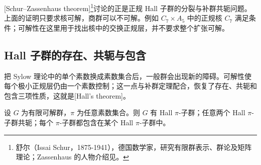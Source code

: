 [Schur--Zassenhaus theorem]\footnote{舒尔（Issai Schur，1875-1941），德国数学家，研究有限群表示、群论及矩阵理论；Zassenhaus 的人物介绍见。}讨论的正是正规 Hall 子群的分裂与补群共轭问题。上面的证明只要求核可解，商群可以不可解。例如 \(C_7\times A_5\) 中的正规核 \(C_7\) 满足条件；可解性在这里用于找出核中的交换正规层，并不要求整个扩张可解。

\subsection{Hall 子群的存在、共轭与包含}
\label{b1:subsec:C06:03}

把 Sylow 理论中的单个素数换成素数集合后，一般群会出现新的障碍。可解性使每个极小正规层仍由一个素数控制；这一点与补群定理配合，恢复了存在、共轭和包含三项性质，这就是[Hall's theorem]。

\begin{theorem}[Hall]\label{b1:thm:C-hall-solvable}
	设 \(G\) 为有限可解群，\(\pi\) 为任意素数集合。则 \(G\) 有 Hall \(\pi\)-子群；任意两个 Hall \(\pi\)-子群共轭；每个 \(\pi\)-子群都包含在某个 Hall \(\pi\)-子群中。
\end{theorem}

